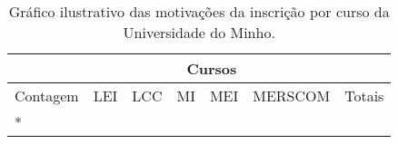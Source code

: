 \documentclass{article}
\begin{document}
\begin{table}[th]
\centering
\begin{tabular}{|l|l|l|l|l|l|r|}
\cline{2-6}
\multicolumn{1}{c}{} & \multicolumn{5}{|c|}{Cursos} & \multicolumn{1}{c}{} \\
\hline
Contagem & LEI & LCC & MI & MEI & MERSCOM & Totais\\
\hline
*
\end{tabular}
\caption{Gráfico ilustrativo das motivações da inscrição por curso da Universidade do Minho.}
\end{table}
\end{document}
